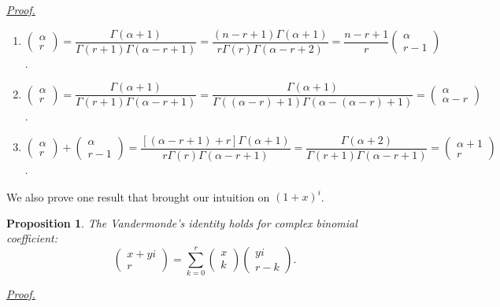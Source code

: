 \documentclass[12pt]{article}
\newtheorem*{proposition}{Proposition}
\renewenvironment{proof}[1][Proof]{\begin{snugshade*} \underline{\textit{{#1}.}}\\}{\hfill \qedsymbol \end{snugshade*}}
\begin{document}
    \begin{proof}
        \begin{enumerate}
            \item $\begin{pmatrix}
                \alpha\\r
            \end{pmatrix}=\dfrac{\Gamma(\alpha+1)}{\Gamma(r+1)\Gamma(\alpha-r+1)}=\dfrac{(n-r+1)\Gamma(\alpha+1)}{r\Gamma(r)\Gamma(\alpha-r+2)}=\dfrac{n-r+1}{r}\begin{pmatrix}
                \alpha\\r-1
            \end{pmatrix}$.
            \item $\begin{pmatrix}
                \alpha\\r
            \end{pmatrix}=\dfrac{\Gamma(\alpha+1)}{\Gamma(r+1)\Gamma(\alpha-r+1)}=\dfrac{\Gamma(\alpha+1)}{\Gamma((\alpha-r)+1)\Gamma(\alpha-(\alpha-r)+1)}=\begin{pmatrix}
                \alpha\\\alpha-r
            \end{pmatrix}$.
            \item $\begin{pmatrix}
                \alpha\\r
            \end{pmatrix}+\begin{pmatrix}
                \alpha\\r-1
            \end{pmatrix}=\dfrac{[(\alpha-r+1)+r]\Gamma(\alpha+1)}{r\Gamma(r)\Gamma(\alpha-r+1)}=\dfrac{\Gamma(\alpha+2)}{\Gamma(r+1)\Gamma(\alpha-r+1)}=\begin{pmatrix}
                \alpha+1\\r
            \end{pmatrix}$.
        \end{enumerate}
    \end{proof}

    We also prove one result that brought our intuition on $(1+x)^i$.

    \begin{proposition}
        The Vandermonde's identity holds for complex binomial coefficient: \[\begin{pmatrix}
            x+yi\\r
        \end{pmatrix}=\sum_{k=0}^{r}\begin{pmatrix}
            x\\k
        \end{pmatrix}\begin{pmatrix}
            yi\\r-k
        \end{pmatrix}.\]
    \end{proposition}

    \begin{proof}
        
    \end{proof}
\end{document}
